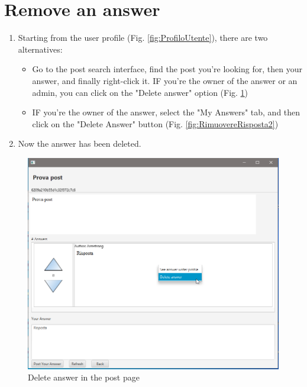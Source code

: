 \documentclass[11pt]{report}
\begin{document}
\section{Remove an answer}
\begin{enumerate}
    \item Starting from the user profile (Fig. \ref{fig:ProfiloUtente}), there are two alternatives:
    \begin{itemize}
        \item Go to the post search interface, find the post you're looking for, then your answer, and finally right-click it. IF you're the owner of the answer or an admin, you can click on the "Delete answer" option (Fig. \ref{fig:RimuovereRisposta1})
        \item IF you're the owner of the answer, select the "My Answers" tab, and then click on the "Delete Answer" button (Fig. \ref{fig:RimuovereRisposta2})
    \end{itemize}
    \item Now the answer has been deleted.
\end{enumerate}
\begin{figure}[H]
  \centering
  \includegraphics[width=\textwidth,keepaspectratio=true]{img/user_manual/RimuovereRisposta1.png}
  \caption{Delete answer in the post page}
  \label{fig:RimuovereRisposta1}
\end{figure}
\end{document}
